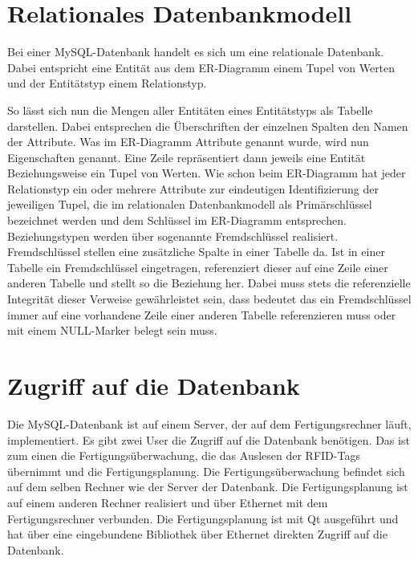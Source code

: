 \section{Relationales Datenbankmodell}\label{kap:relationales_Datenbankmodell}
Bei einer MySQL-Datenbank handelt es sich um eine relationale Datenbank. Dabei entspricht eine Entität aus dem ER-Diagramm einem Tupel von Werten und der Entitätstyp einem Relationstyp. 

So lässt sich nun die Mengen aller Entitäten eines Entitätstyps als Tabelle darstellen. Dabei entsprechen die Überschriften der einzelnen Spalten den Namen der Attribute. Was im ER-Diagramm Attribute genannt wurde, wird nun Eigenschaften genannt. Eine Zeile repräsentiert dann jeweils eine Entität Beziehungsweise ein Tupel von Werten. Wie schon beim ER-Diagramm hat jeder Relationstyp ein oder mehrere Attribute zur eindeutigen Identifizierung der jeweiligen Tupel, die im relationalen Datenbankmodell als Primärschlüssel bezeichnet werden und dem Schlüssel im ER-Diagramm entsprechen. Beziehungstypen werden über sogenannte Fremdschlüssel realisiert. Fremdschlüssel stellen eine zusätzliche Spalte in einer Tabelle da. Ist in einer Tabelle ein Fremdschlüssel eingetragen, referenziert dieser auf eine  Zeile einer anderen Tabelle und stellt so die Beziehung her. Dabei muss stets die referenzielle Integrität dieser Verweise gewährleistet sein, dass bedeutet das ein Fremdschlüssel immer auf eine vorhandene Zeile einer anderen Tabelle referenzieren muss oder mit einem NULL-Marker belegt sein muss. 

\section{Zugriff auf die Datenbank}\label{kap:DatenbankZugriff}
Die MySQL-Datenbank ist auf einem Server, der auf dem Fertigungsrechner läuft, implementiert. Es gibt zwei User die Zugriff auf die Datenbank benötigen. Das ist zum einen die Fertigungsüberwachung, die das Auslesen der RFID-Tags übernimmt und die Fertigungsplanung. Die Fertigungsüberwachung befindet sich auf dem selben Rechner wie der Server der Datenbank. Die Fertigungsplanung ist auf einem anderen Rechner realisiert und über Ethernet mit dem Fertigungsrechner verbunden. Die Fertigungsplanung ist mit Qt ausgeführt und hat über eine eingebundene Bibliothek über Ethernet direkten Zugriff auf die Datenbank. 

